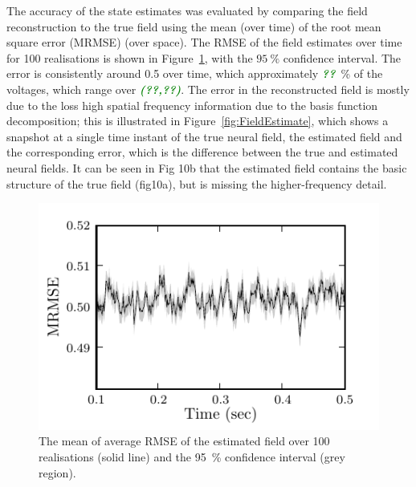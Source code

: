 \documentclass[10pt,a4paper]{article}
\newcommand{\dean}[1]{\textsf{\emph{\textbf{\textcolor{green}{#1}}}}}
\begin{document}
The accuracy of the state estimates was evaluated by comparing the field reconstruction to the true field using the mean (over time) of the root mean square error (MRMSE) (over space). The RMSE of the field estimates over time for 100 realisations is shown in Figure~\ref{fig:RMSE}, with the $95~\%$ confidence interval. The error is consistently around 0.5 over time, which approximately \dean{??}~\% of the voltages, which range over \dean{(??,??)}. The error in the reconstructed field is mostly due to the loss high spatial frequency information due to the basis function decomposition; this is illustrated in Figure~\ref{fig:FieldEstimate}, which shows a snapshot at a single time instant of the true neural field, the estimated field and the corresponding error, which is the difference between the true and estimated neural fields. It can be seen in Fig 10b that the estimated field contains the basic structure of the true field (fig10a), but is missing the higher-frequency detail.
  \begin{figure}
   	\begin{center}
   		\includegraphics{./Graph/MRMSE.pdf} 
   	\end{center}
   	\caption{The mean of average RMSE of the estimated field over 100 realisations (solid line) and the 95~\% confidence interval (grey region). } 
\label{fig:RMSE}
   \end{figure}
  
\end{document}
